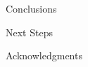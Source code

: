 \begin{frame}[t]{Conclusions}
    
    
    
\end{frame}


\begin{frame}[t]{Next Steps}
    
    
    
\end{frame}


\begin{frame}[t]{Acknowledgments}
    
    
    
\end{frame}